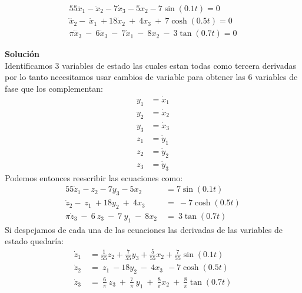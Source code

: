 \documentclass[letterpaper, 12pt]{article}
\begin{document}
\begin{enumerate}
\begin{enumerate}
\begin{equation}
\begin{split}
    55\dddot{x}_1-\ddot{x}_2-7\dot{x}_3-5x_2-7\sin(0.1t)=0 \\
    {\dddot{x}}_2-\ {\ddot{x}}_1\ +18{\dot{x}}_2\ +\ 4x_3\ +\ 7\cosh(0.5t)=0 \\
    \pi\dddot{x}_3\ -\ 6\ddot{x}_3\ -\ 7\dot{x}_1\ -\ 8x_2\ -\ 3\tan(0.7t) =0 
\end{split}
\end{equation}

\textbf{Solución} \\
Identificamos 3 variables de estado las cuales estan todas como tercera derivadas por lo tanto necesitamos usar cambios de variable para obtener las 6 variables de fase que los complementan:
\begin{equation}
\begin{split}
    y_1 &= \dot{x}_1 \\
    y_2 &= \dot{x}_2 \\
    y_3 &= \dot{x}_3 \\
    z_1 &= \dot{y}_1 \\
    z_2 &= \dot{y}_2 \\
    z_3 &= \dot{y}_3 \label{2.b.CambioV}
\end{split} 
\end{equation}
Podemos entonces reescribir las ecuaciones como:
\begin{align*}
    55\dot{z}_1-z_2-7y_3-5x_2 &= 7\sin(0.1t) \\
    {\dot{z}}_2-\ z_1\ +18y_2\ +\ 4x_3\ &=\ -7 \cosh(0.5t) \\
    \pi\dot{z}_3\ -\ 6\ z_3\ -\ 7\ y_1\ -\ 8x_2\ &=\ 3\tan(0.7t) \   
\end{align*}
Si despejamos de cada una de las ecuaciones las derivadas de las variables de estado quedaría:
 \begin{equation}
 \begin{split}
    \dot{z}_1&=\frac{1}{55}z_2+\frac{7}{55}y_3+\frac{5}{55}x_2+\frac{7}{55}\sin(0.1t) \\
    {\dot{z}}_2&=\ z_1\ -18y_2\ -\ 4x_3\ \ -7\cosh(0.5t)  \\
    \dot{z}_3\ &=\ \frac{6}{\pi}\ z_3\ +\ \frac{7}{\pi}\ y_1\ +\ \frac{8}{\pi}x_2\ +\ \frac{8}{\pi}\tan(0.7t)
    \label{1.b.mainV}
\end{split}
\end{equation}


\end{enumerate}
\end{enumerate}
\end{document}
